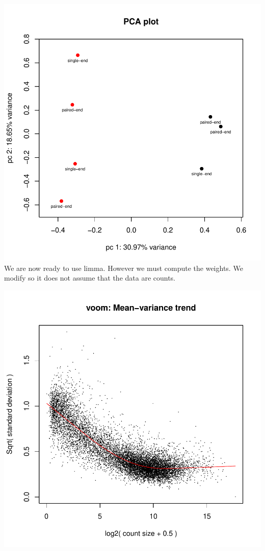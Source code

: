 \documentclass{article}
\begin{document}
\includegraphics{example-007}
We are now ready to use limma. However we must compute the weights. We modify so
it does not assume that the data are counts.
\begin{Schunk}
\end{Schunk}
\includegraphics{example-008}
\end{document}
